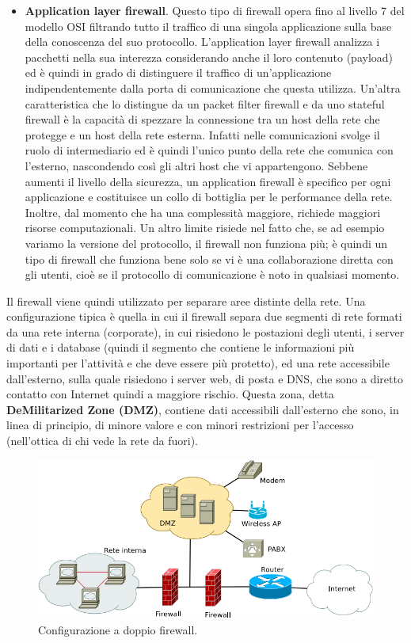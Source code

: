 \begin{itemize}
	\item \textbf{Application layer firewall}. Questo tipo di firewall opera fino al livello 7 del modello OSI filtrando tutto il traffico di una singola applicazione sulla base della conoscenza del suo protocollo. L'application layer firewall analizza i pacchetti nella sua interezza considerando anche il loro contenuto (payload) ed è quindi in grado di distinguere il traffico di un'applicazione indipendentemente dalla porta di comunicazione che questa utilizza. Un'altra caratteristica che lo distingue da un packet filter firewall e da uno stateful firewall è la capacità di spezzare la connessione tra un host della rete che protegge e un host della rete esterna. Infatti nelle comunicazioni svolge il ruolo di intermediario ed è quindi l'unico punto della rete che comunica con l'esterno, nascondendo così gli altri host che vi appartengono. Sebbene aumenti il livello della sicurezza, un application firewall è specifico per ogni applicazione e costituisce un collo di bottiglia per le performance della rete. Inoltre, dal momento che ha una complessità maggiore, richiede maggiori risorse computazionali. Un altro limite risiede nel fatto che, se ad esempio variamo la versione del protocollo, il firewall non funziona più; è quindi un tipo di firewall che funziona bene solo se vi è una collaborazione diretta con gli utenti, cioè se il protocollo di comunicazione è noto in qualsiasi momento.
\end{itemize}
Il firewall viene quindi utilizzato per separare aree distinte della rete. Una configurazione tipica è quella in cui il firewall separa due segmenti di rete formati da una rete interna (corporate), in cui risiedono le postazioni degli utenti, i server di dati e i database (quindi il segmento che contiene le informazioni più importanti per l'attività e che deve essere più protetto), ed una rete accessibile dall'esterno, sulla quale risiedono i server web, di posta e DNS, che sono a diretto contatto con Internet quindi a maggiore rischio. Questa zona, detta \textbf{DeMilitarized Zone (DMZ)}, contiene dati accessibili dall'esterno che sono, in linea di principio, di minore valore e con minori restrizioni per l'accesso (nell'ottica di chi vede la rete da fuori).\\
\begin{figure}[htbp]
	\centering
	\includegraphics[scale = 0.5]{images/double-firewall}
	\caption{Configurazione a doppio firewall.}
	\label{img:double-firewall}
\end{figure}
